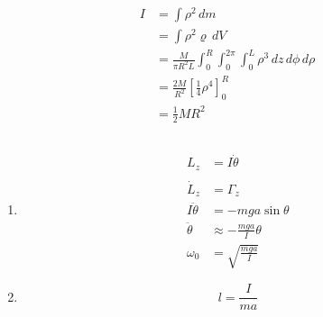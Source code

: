 \documentclass{article}
\begin{document}
\setcounter{subsection}{8}
\subsection{}

\begin{align*}
  I & = \int \rho^2 \,d m                                                                   \\
    & = \int \rho^2 \varrho \,d V                                                           \\
    & = \frac{M}{\pi R^2 L} \int_0^R \int_0^{2 \pi} \int_0^L \rho^3 \,d z \,d \phi \,d \rho \\
    & = \frac{2 M}{R^2} \left[ \frac{1}{4} \rho^4 \right]_0^R                               \\
    & = \frac{1}{2} M R^2
\end{align*}

\setcounter{subsection}{12}
\subsection{}

\begin{enumerate}
  \item

        \begin{align*}
          L_z             & = I \dot{\theta}                \\ \\
          \dot{L}_z       & = \Gamma_z                      \\
          I \ddot{\theta} & = -m g a \sin \theta            \\
          \ddot{\theta}   & \approx -\frac{m g a}{I} \theta \\
          \omega_0        & = \sqrt{\frac{m g a}{I}}
        \end{align*}

  \item \[l = \frac{I}{m a}\]
\end{enumerate}

\setcounter{subsection}{14}
\subsection{}
\end{document}

